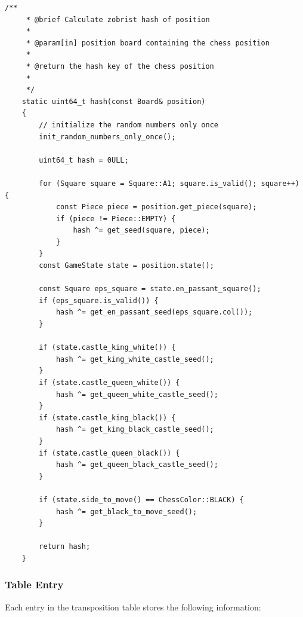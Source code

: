 \begin{lstlisting}[breaklines=true, caption={Code example to calculate zobrist hash of position}, label={lst:zobrist_calculate_hash}]
    /**
     * @brief Calculate zobrist hash of position
     * 
     * @param[in] position board containing the chess position
     * 
     * @return the hash key of the chess position
     * 
     */
    static uint64_t hash(const Board& position)
    {
        // initialize the random numbers only once
        init_random_numbers_only_once();   

        uint64_t hash = 0ULL;

        for (Square square = Square::A1; square.is_valid(); square++) {
            const Piece piece = position.get_piece(square);
            if (piece != Piece::EMPTY) {
                hash ^= get_seed(square, piece);
            }
        }
        const GameState state = position.state();

        const Square eps_square = state.en_passant_square();
        if (eps_square.is_valid()) {
            hash ^= get_en_passant_seed(eps_square.col());
        }

        if (state.castle_king_white()) {
            hash ^= get_king_white_castle_seed();
        }
        if (state.castle_queen_white()) {
            hash ^= get_queen_white_castle_seed();
        }
        if (state.castle_king_black()) {
            hash ^= get_king_black_castle_seed();
        }
        if (state.castle_queen_black()) {
            hash ^= get_queen_black_castle_seed();
        }

        if (state.side_to_move() == ChessColor::BLACK) {
            hash ^= get_black_to_move_seed();
        }

        return hash;
    }
\end{lstlisting}

\subsubsection{Table Entry}

Each entry in the transposition table stores the following information:

